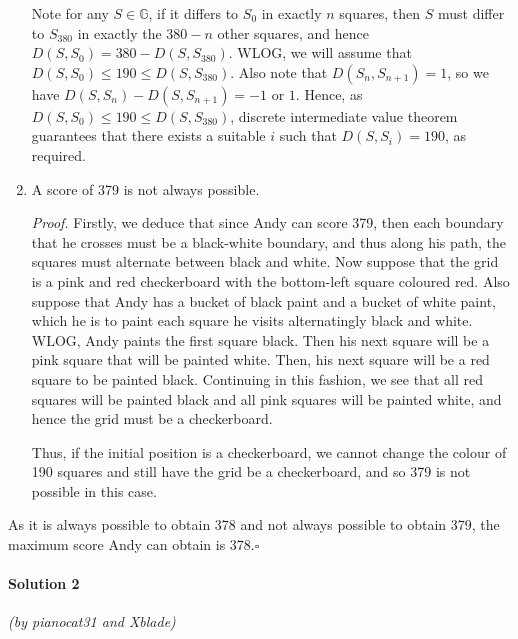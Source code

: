 \documentclass[10pt]{article}
\begin{document}
\begin{enumerate}
	    Note for any \(S \in \mathbb{G}\), if it differs to \(S_0\) in exactly \(n\) squares, then \(S\) must differ to \(S_{380}\) in exactly the \(380-n\) other squares, and hence \(D(S, S_0) = 380 - D(S, S_{380})\). WLOG, we will assume that \(D(S, S_0) \leq 190 \leq D(S, S_{380})\). Also note that \(D(S_n, S_{n+1}) = 1\), so we have \(D(S,S_n) - D(S,S_{n+1}) = -1 \) or \(1\). Hence, as \(D(S, S_0) \leq 190 \leq D(S, S_{380})\), discrete intermediate value theorem guarantees that there exists a suitable \(i\) such that \(D(S, S_i) = 190\), as required.
	    
	    \item A score of 379 is not always possible.
	    
	    \emph{Proof.} Firstly, we deduce that since Andy can score 379, then each boundary that he crosses must be a black-white boundary, and thus along his path, the squares must alternate between black and white. Now suppose that the grid is a pink and red checkerboard with the bottom-left square coloured red. Also suppose that Andy has a bucket of black paint and a bucket of white paint, which he is to paint each square he visits alternatingly black and white. WLOG, Andy paints the first square black. Then his next square will be a pink square that will be painted white. Then, his next square will be a red square to be painted black. Continuing in this fashion, we see that all red squares will be painted black and all pink squares will be painted white, and hence the grid must be a checkerboard.
	
	    Thus, if the initial position is a checkerboard, we cannot change the colour of 190 squares and still have the grid be a checkerboard, and so 379 is not possible in this case.

	\end{enumerate}
	As it is always possible to obtain 378 and not always possible to obtain 379, the maximum score Andy can obtain is 378.\hfill\ensuremath{\square}\\
	
		\noindent \makebox[\linewidth]{\rule{\textwidth}{0.4pt}}
	
	\paragraph{Solution 2} \textit{(by pianocat31 and Xblade)}\\
	
\end{document}
